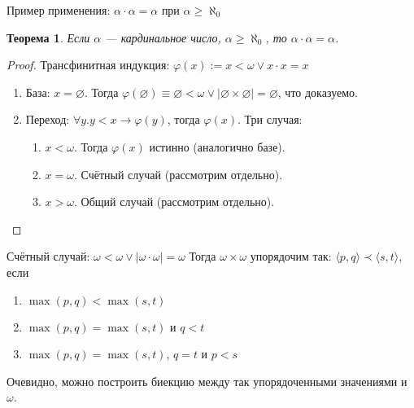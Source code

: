 \documentclass[aspectratio=169]{beamer}
\newtheorem{thm}{Теорема}[section]
\begin{document}
\begin{frame}{Пример применения: $\alpha\cdot\alpha = \alpha$ при $\alpha \ge \aleph_0$}
\begin{thm}Если $\alpha$ --- кардинальное число, $\alpha \ge \aleph_0$, 
то $\alpha\cdot\alpha = \alpha$.\end{thm}
\begin{proof}Трансфинитная индукция: $\varphi(x) := x < \omega \vee x \cdot x = x$
\begin{enumerate}
\item База: $x = \varnothing$. Тогда 
$\varphi(\varnothing) \equiv \varnothing < \omega \vee |\varnothing \times \varnothing| = \varnothing$,
что доказуемо.
\item Переход: $\forall y.y < x \rightarrow \varphi(y)$, тогда $\varphi(x)$. Три случая:
\begin{enumerate}
\item $x < \omega$. Тогда $\varphi(x)$ истинно (аналогично базе).
\item $x = \omega$. Счётный случай (рассмотрим отдельно).
\item $x > \omega$. Общий случай (рассмотрим отдельно).
\end{enumerate}
\end{enumerate}
\end{proof}
\end{frame}

\begin{frame}{Счётный случай: $\omega < \omega \vee |\omega \cdot \omega| = \omega$}
Тогда $\omega \times \omega$ упорядочим так: $\langle p,q \rangle \prec \langle s,t \rangle$,
если \begin{enumerate}
\item $\max(p,q) < \max(s,t)$
\item $\max(p,q) = \max(s,t)$ и $q < t$
\item $\max(p,q) = \max(s,t)$, $q = t$ и $p < s$
\end{enumerate}
Очевидно, можно построить биекцию между так упорядоченными значениями и $\omega$.

\begin{center}\end{center}
\end{frame}
\end{document}
